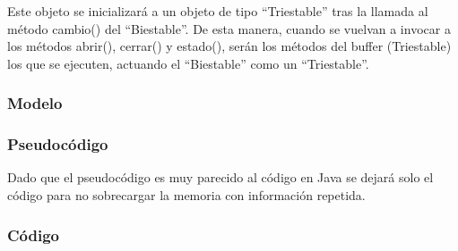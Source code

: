 \documentclass[11pt,a4paper]{article}
\begin{document}
Este objeto se inicializará a un objeto de tipo ``Triestable'' tras la llamada al método cambio() del ``Biestable''. De esta manera, cuando se vuelvan a invocar a los métodos abrir(), cerrar() y estado(), serán los métodos del buffer (Triestable) los que se ejecuten, actuando el ``Biestable'' como un ``Triestable''.

\subsubsection{Modelo}


\begin{figure}[H]
\end{figure}

\subsubsection{Pseudocódigo}

Dado que el pseudocódigo es muy parecido al código en Java se dejará solo el código para no sobrecargar la memoria con información repetida.

\subsubsection{Código}




\end{document}
